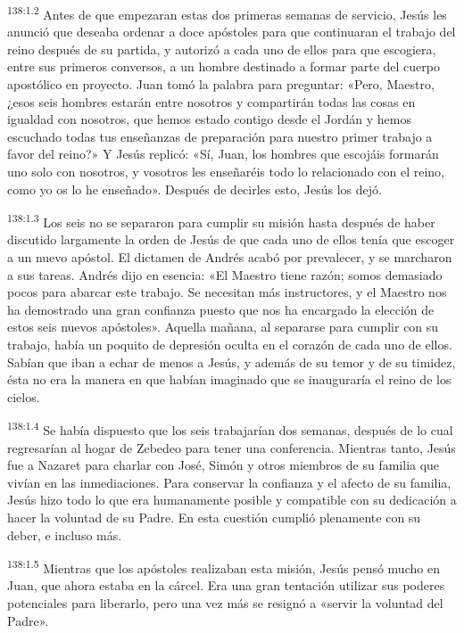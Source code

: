 \par 
\textsuperscript{138:1.2} Antes de que empezaran estas dos primeras semanas de servicio, Jesús les anunció que deseaba ordenar a doce apóstoles para que continuaran el trabajo del reino después de su partida, y autorizó a cada uno de ellos para que escogiera, entre sus primeros conversos, a un hombre destinado a formar parte del cuerpo apostólico en proyecto. Juan tomó la palabra para preguntar: «Pero, Maestro, ¿esos seis hombres estarán entre nosotros y compartirán todas las cosas en igualdad con nosotros, que hemos estado contigo desde el Jordán y hemos escuchado todas tus enseñanzas de preparación para nuestro primer trabajo a favor del reino?» Y Jesús replicó: «Sí, Juan, los hombres que escojáis formarán uno solo con nosotros, y vosotros les enseñaréis todo lo relacionado con el reino, como yo os lo he enseñado». Después de decirles esto, Jesús los dejó.

\par 
\textsuperscript{138:1.3} Los seis no se separaron para cumplir su misión hasta después de haber discutido largamente la orden de Jesús de que cada uno de ellos tenía que escoger a un nuevo apóstol. El dictamen de Andrés acabó por prevalecer, y se marcharon a sus tareas. Andrés dijo en esencia: «El Maestro tiene razón; somos demasiado pocos para abarcar este trabajo. Se necesitan más instructores, y el Maestro nos ha demostrado una gran confianza puesto que nos ha encargado la elección de estos seis nuevos apóstoles». Aquella mañana, al separarse para cumplir con su trabajo, había un poquito de depresión oculta en el corazón de cada uno de ellos. Sabían que iban a echar de menos a Jesús, y además de su temor y de su timidez, ésta no era la manera en que habían imaginado que se inauguraría el reino de los cielos.

\par 
\textsuperscript{138:1.4} Se había dispuesto que los seis trabajarían dos semanas, después de lo cual regresarían al hogar de Zebedeo para tener una conferencia. Mientras tanto, Jesús fue a Nazaret para charlar con José, Simón y otros miembros de su familia que vivían en las inmediaciones. Para conservar la confianza y el afecto de su familia, Jesús hizo todo lo que era humanamente posible y compatible con su dedicación a hacer la voluntad de su Padre. En esta cuestión cumplió plenamente con su deber, e incluso más.

\par 
\textsuperscript{138:1.5} Mientras que los apóstoles realizaban esta misión, Jesús pensó mucho en Juan, que ahora estaba en la cárcel. Era una gran tentación utilizar sus poderes potenciales para liberarlo, pero una vez más se resignó a «servir la voluntad del Padre».

